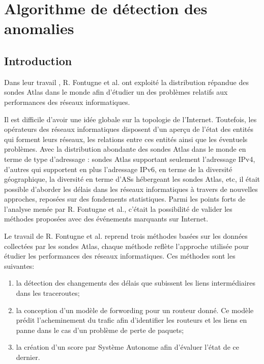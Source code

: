 
\chapter{Algorithme de détection des anomalies}

\section{Introduction}

 Dans leur travail \cite{DBLP:journals/corr/FontugneAPB16},  R. Fontugne et al. ont exploité la  distribution répandue des sondes Atlas dans le monde afin d'étudier un des problèmes relatifs aux performances des réseaux informatiques. 
 
    Il est  difficile  d'avoir une idée globale sur la topologie de l'Internet. Toutefois, les opérateurs des réseaux informatiques  disposent d'un aperçu de l'état des entités qui forment leurs réseaux, les relations entre ces entités ainsi que les éventuels problèmes. Avec la distribution abondante des sondes Atlas dans le monde en terme de type d'adressage : sondes Atlas supportant seulement l'adressage IPv4, d'autres qui supportent en plus l'adressage IPv6, en terme de  la diversité géographique, la diversité en terme d'ASs hébergeant les sondes Atlas, etc, il était  possible d'aborder  les délais dans les réseaux informatiques à travers de nouvelles approches, reposées sur des fondements statistiques. Parmi les points forts de l'analyse menée par R. Fontugne et al., c'était la possibilité de valider les   méthodes proposées avec des événements  marquants sur Internet.
    
Le travail de R. Fontugne et al. reprend trois méthodes basées sur les données collectées par les sondes Atlas, chaque méthode reflète l'approche utilisée pour étudier les performances des réseaux informatiques. Ces méthodes sont les suivantes:

\begin{enumerate}
	\item la détection des changements des délais que subissent les liens intermédiaires dans les traceroutes; 
	
	\item la conception d'un modèle de forwording pour un routeur donné. Ce modèle  prédit l'acheminement du trafic afin d'identifier les routeurs  et les liens en panne dans le cas  d'un problème  de perte de paquets;
	
	\item la création d'un score par Système Autonome afin d'évaluer l'état de ce dernier.
	
\end{enumerate}


